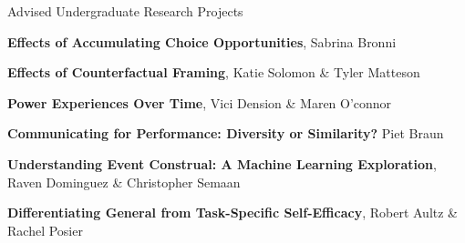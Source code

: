 \begin{rubric}{Advised Undergraduate Research Projects}

\entry*[2017a] \textbf{Effects of Accumulating Choice Opportunities}, Sabrina Bronni

\entry*[2017b] \textbf{Effects of Counterfactual Framing}, Katie Solomon \& Tyler Matteson

\entry*[2017c] \textbf{Power Experiences Over Time}, Vici Dension \& Maren O'connor

\entry*[2017d] \textbf{Communicating for Performance: Diversity or Similarity?} Piet Braun

\entry*[2017e] \textbf{Understanding Event Construal: A Machine Learning Exploration}, Raven Dominguez \& Christopher Semaan

\entry*[2017f] \textbf{Differentiating General from Task-Specific Self-Efficacy}, Robert Aultz \& Rachel Posier


\end{rubric}